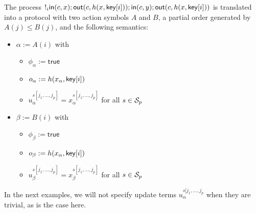 \begin{example}
  The process $!_i 
  \mathsf{in}(c,x);\mathsf{out}(c,h(x,\mathsf{key}[i]));\mathsf{in}(c,y);\mathsf{out}(c,h(x,\mathsf{key}[i]))$
  is translated into a protocol with two action symbols $A$ and $B$,
  a partial order generated by $A(j) \leq B(j)$, and the following
  semantics:
  \begin{itemize}
    \item $\alpha := A(i)$ with
      \begin{itemize}
        \item $\phi_\alpha := \mathsf{true}$
        \item $o_\alpha := h(x_\alpha,\mathsf{key}[i])$
        \item $u_\alpha^{s[j_1,\ldots,j_p]} = x_\alpha^{s[j_1,\ldots,j_p]}$
          for all $s\in\mathcal{S}_p$
      \end{itemize}
    \item $\beta := B(i)$ with
      \begin{itemize}
        \item $\phi_\beta := \mathsf{true}$
        \item $o_\beta := h(x_\alpha,\mathsf{key}[i])$
        \item $u_\beta^{s[j_1,\ldots,j_p]} = x_\beta^{s[j_1,\ldots,j_p]}$
          for all $s\in\mathcal{S}_p$
      \end{itemize}
  \end{itemize}
  In the next examples, we will not specify update terms 
  $u_\alpha^{s[j_1,\ldots,j_p}$ when they are trivial, as is the case
  here.
\end{example}

